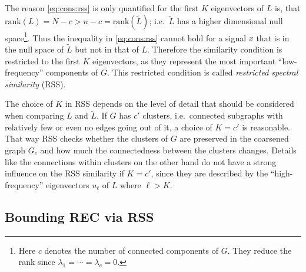 The reason \cref{eq:cons:rss} is only quantified for the first $K$ eigenvectors of $L$ is, that $\text{rank}(L) = N - c > n - c = \text{rank}(\widetilde{L})$;
i.e.\ $\widetilde{L}$ has a higher dimensional null space\footnote{%
	Here $c$ denotes the number of connected components of $G$.
	They reduce the rank since $\lambda_1 = \cdots = \lambda_c = 0$.
}.
Thus the inequality in \cref{eq:cons:rss} cannot hold for a signal $x$ that is in the null space of $\widetilde{L}$ but not in that of $L$.
Therefore the similarity condition is restricted to the first $K$ eigenvectors, as they represent the most important ``low-frequency'' components of $G$.
This restricted condition is called \textit{restricted spectral similarity} (RSS).

The choice of $K$ in RSS depends on the level of detail that should be considered when comparing $L$ and $\widetilde{L}$.
If $G$ has $c'$ clusters, i.e.\ connected subgraphs with relatively few or even no edges going out of it, a choice of $K = c'$ is reasonable.
That way RSS checks whether the clusters of $G$ are preserved in the coarsened graph $G_c$ and how much the connectedness between the clusters changes.
Details like the connections within clusters on the other hand do not have a strong influence on the RSS similarity if $K = c'$, since they are described by the ``high-frequency'' eigenvectors $u_\ell$ of $L$ where $\ell > K$.

\subsection{Bounding REC via RSS}%
\label{sec:cons:bound}

